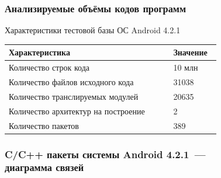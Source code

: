 \documentclass[hyperref={pdfpagelabels=false},10pt]{beamer}
\begin{document}
\begin{frame}
\frametitle{Анализируемые объёмы кодов программ}
Характеристики тестовой базы ОС Android 4.2.1
\begin{table} [htbp]
  \centering
  \parbox{15cm}{\label{table:android-char}}
  \begin{tabular}{| p{0.7\linewidth} || p{0.2\linewidth} |}
  \hline
  \hline
  \textbf{Характеристика}   & \textbf{Значение} \\
  \hline
  \hline
  Количество строк кода   & 10 млн \\
  \hline
  Количество файлов исходного кода      & 31038    \\
  \hline
  Количество транслируемых модулей  & 20635   \\
  \hline
  Количество архитектур на построение & 2   \\
  \hline
  Количество пакетов & 389 \\
  \hline
  \hline
  \end{tabular}
\end{table}
\end{frame}
\begin{frame}
\frametitle{C/C++ пакеты системы Android 4.2.1~---\\диаграмма связей}
\begin{figure}[h]
\end{figure}
\end{frame}
\end{document}
